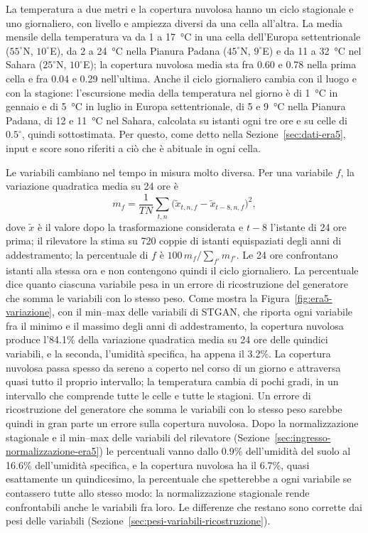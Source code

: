 La temperatura a due metri e la copertura nuvolosa hanno un ciclo stagionale e uno giornaliero, con livello e ampiezza diversi da una cella all'altra. La media mensile della temperatura va da 1 a 17~°C in una cella dell'Europa settentrionale ($55^\circ$N, $10^\circ$E), da 2 a 24~°C nella Pianura Padana ($45^\circ$N, $9^\circ$E) e da 11 a 32~°C nel Sahara ($25^\circ$N, $10^\circ$E); la copertura nuvolosa media sta fra 0.60 e 0.78 nella prima cella e fra 0.04 e 0.29 nell'ultima. Anche il ciclo giornaliero cambia con il luogo e con la stagione: l'escursione media della temperatura nel giorno è di 1~°C in gennaio e di 5~°C in luglio in Europa settentrionale, di 5 e 9~°C nella Pianura Padana, di 12 e 11~°C nel Sahara, calcolata su istanti ogni tre ore e su celle di $0.5^\circ$, quindi sottostimata. Per questo, come detto nella Sezione~\ref{sec:dati-era5}, input e score sono riferiti a ciò che è abituale in ogni cella.

Le variabili cambiano nel tempo in misura molto diversa. Per una variabile $f$, la variazione quadratica media su 24 ore è
\begin{equation}
    m_f=\frac{1}{TN}\sum_{t,n}\bigl(\tilde{x}_{t,n,f}-\tilde{x}_{t-8,n,f}\bigr)^2,
    \label{eq:variazione-24h}
\end{equation}
dove $\tilde{x}$ è il valore dopo la trasformazione considerata e $t-8$ l'istante di 24 ore prima; il rilevatore la stima su 720 coppie di istanti equispaziati degli anni di addestramento; la percentuale di $f$ è $100\,m_f/\sum_{f'}m_{f'}$. Le 24 ore confrontano istanti alla stessa ora e non contengono quindi il ciclo giornaliero. La percentuale dice quanto ciascuna variabile pesa in un errore di ricostruzione del generatore che somma le variabili con lo stesso peso. Come mostra la Figura~\ref{fig:era5-variazione}, con il min--max delle variabili di STGAN, che riporta ogni variabile fra il minimo e il massimo degli anni di addestramento, la copertura nuvolosa produce l'84.1\% della variazione quadratica media su 24 ore delle quindici variabili, e la seconda, l'umidità specifica, ha appena il 3.2\%. La copertura nuvolosa passa spesso da sereno a coperto nel corso di un giorno e attraversa quasi tutto il proprio intervallo; la temperatura cambia di pochi gradi, in un intervallo che comprende tutte le celle e tutte le stagioni. Un errore di ricostruzione del generatore che somma le variabili con lo stesso peso sarebbe quindi in gran parte un errore sulla copertura nuvolosa. Dopo la normalizzazione stagionale e il min--max delle variabili del rilevatore (Sezione~\ref{sec:ingresso-normalizzazione-era5}) le percentuali vanno dallo 0.9\% dell'umidità del suolo al 16.6\% dell'umidità specifica, e la copertura nuvolosa ha il 6.7\%, quasi esattamente un quindicesimo, la percentuale che spetterebbe a ogni variabile se contassero tutte allo stesso modo: la normalizzazione stagionale rende confrontabili anche le variabili fra loro. Le differenze che restano sono corrette dai pesi delle variabili (Sezione~\ref{sec:pesi-variabili-ricostruzione}).

